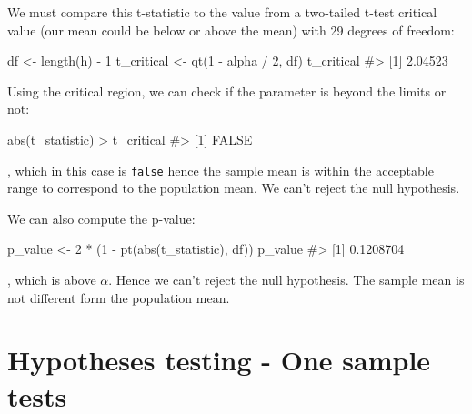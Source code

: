 \documentclass[
  letterpaper,
  DIV=11,
  numbers=noendperiod]{scrreprt}
\newenvironment{Shaded}{\begin{snugshade}}{\end{snugshade}}
\newcommand{\CommentTok}[1]{\textcolor[rgb]{0.37,0.37,0.37}{#1}}
\newcommand{\DecValTok}[1]{\textcolor[rgb]{0.68,0.00,0.00}{#1}}
\newcommand{\FunctionTok}[1]{\textcolor[rgb]{0.28,0.35,0.67}{#1}}
\newcommand{\NormalTok}[1]{\textcolor[rgb]{0.00,0.23,0.31}{#1}}
\newcommand{\OtherTok}[1]{\textcolor[rgb]{0.00,0.23,0.31}{#1}}
\newcommand{\SpecialCharTok}[1]{\textcolor[rgb]{0.37,0.37,0.37}{#1}}
\begin{document}
We must compare this t-statistic to the value from a two-tailed t-test
critical value (our mean could be below or above the mean) with 29
degrees of freedom:

\begin{Shaded}
\begin{Highlighting}[]
\NormalTok{df }\OtherTok{\textless{}{-}} \FunctionTok{length}\NormalTok{(h) }\SpecialCharTok{{-}} \DecValTok{1}
\NormalTok{t\_critical }\OtherTok{\textless{}{-}} \FunctionTok{qt}\NormalTok{(}\DecValTok{1} \SpecialCharTok{{-}}\NormalTok{ alpha }\SpecialCharTok{/} \DecValTok{2}\NormalTok{, df)}
\NormalTok{t\_critical}
\CommentTok{\#\textgreater{} [1] 2.04523}
\end{Highlighting}
\end{Shaded}

Using the critical region, we can check if the parameter is beyond the
limits or not:

\begin{Shaded}
\begin{Highlighting}[]
\FunctionTok{abs}\NormalTok{(t\_statistic) }\SpecialCharTok{\textgreater{}}\NormalTok{ t\_critical}
\CommentTok{\#\textgreater{} [1] FALSE}
\end{Highlighting}
\end{Shaded}

, which in this case is \texttt{false} hence the sample mean is within
the acceptable range to correspond to the population mean. We can't
reject the null hypothesis.

We can also compute the p-value:

\begin{Shaded}
\begin{Highlighting}[]
\NormalTok{p\_value }\OtherTok{\textless{}{-}} \DecValTok{2} \SpecialCharTok{*}\NormalTok{ (}\DecValTok{1} \SpecialCharTok{{-}} \FunctionTok{pt}\NormalTok{(}\FunctionTok{abs}\NormalTok{(t\_statistic), df))}
\NormalTok{p\_value}
\CommentTok{\#\textgreater{} [1] 0.1208704}
\end{Highlighting}
\end{Shaded}

, which is above \(\alpha\). Hence we can't reject the null hypothesis.
The sample mean is not different form the population mean.

\chapter{Hypotheses testing - One sample
tests}\label{hypotheses-testing---one-sample-tests}
\end{document}
